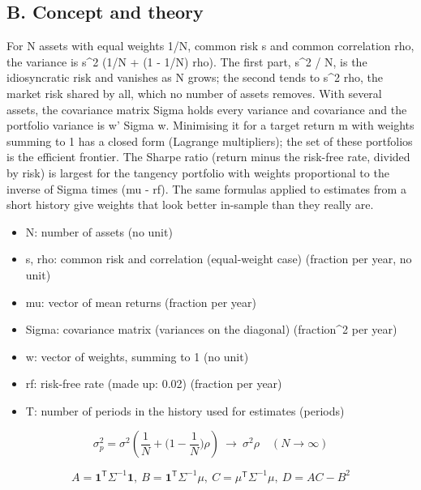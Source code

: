 \documentclass[11pt,a4paper]{article}
\begin{document}
\subsection*{B. Concept and theory}
For N assets with equal weights 1/N, common risk s and common correlation rho, the variance is s\textasciicircum{}2 (1/N + (1 - 1/N) rho). The first part, s\textasciicircum{}2 / N, is the idiosyncratic risk and vanishes as N grows; the second tends to s\textasciicircum{}2 rho, the market risk shared by all, which no number of assets removes. With several assets, the covariance matrix Sigma holds every variance and covariance and the portfolio variance is w' Sigma w. Minimising it for a target return m with weights summing to 1 has a closed form (Lagrange multipliers); the set of these portfolios is the efficient frontier. The Sharpe ratio (return minus the risk-free rate, divided by risk) is largest for the tangency portfolio with weights proportional to the inverse of Sigma times (mu - rf). The same formulas applied to estimates from a short history give weights that look better in-sample than they really are.

\begin{itemize}[nosep]
\item N: number of assets (no unit)
\item s, rho: common risk and correlation (equal-weight case) (fraction per year, no unit)
\item mu: vector of mean returns (fraction per year)
\item Sigma: covariance matrix (variances on the diagonal) (fraction\textasciicircum{}2 per year)
\item w: vector of weights, summing to 1 (no unit)
\item rf: risk-free rate (made up: 0.02) (fraction per year)
\item T: number of periods in the history used for estimates (periods)
\end{itemize}

\begin{equation*}
\sigma_p^2=\sigma^2\left(\frac1N+\Big(1-\frac1N\Big)\rho\right)\ \longrightarrow\ \sigma^2\rho\quad(N\to\infty)
\end{equation*}

\begin{equation*}
A=\mathbf 1^{\mathsf T}\Sigma^{-1}\mathbf 1,\ B=\mathbf 1^{\mathsf T}\Sigma^{-1}\mu,\ C=\mu^{\mathsf T}\Sigma^{-1}\mu,\ D=AC-B^2
\end{equation*}
\end{document}
